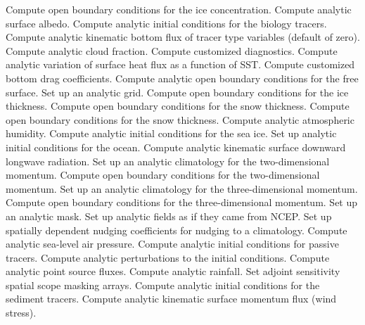    \begin{klist}
      Compute open boundary conditions for the ice
   concentration.
      Compute analytic surface albedo.
      Compute analytic initial conditions for the
   biology tracers.
       Compute analytic kinematic bottom flux of
   tracer type variables (default of zero).
      Compute analytic cloud fraction.
      Compute customized diagnostics.
      Compute analytic variation of surface heat
   flux as a function of SST.
      Compute customized bottom drag coefficients.
      Compute analytic open boundary conditions for
   the free surface.
       Set up an analytic grid.
      Compute open boundary conditions for the ice
   thickness.
      Compute open boundary conditions for the snow
   thickness.
      Compute open boundary conditions for the snow
   thickness.
      Compute analytic atmospheric humidity.
      Compute analytic initial conditions for the sea ice.
       Set up analytic initial conditions for the ocean.
       Compute analytic kinematic surface
   downward longwave radiation.
      Set up an analytic climatology for the
   two-dimensional momentum.
      Compute open boundary conditions for the
   two-dimensional momentum.
      Set up an analytic climatology for the
   three-dimensional momentum.
      Compute open boundary conditions for the
   three-dimensional momentum.
       Set up an analytic mask.
       Set up analytic fields as if they came from NCEP.
       Set up spatially dependent nudging
   coefficients for nudging to a climatology.
       Compute analytic sea-level air pressure.
       Compute analytic initial conditions for
   passive tracers.
       Compute analytic perturbations to the
   initial conditions.
       Compute analytic point source fluxes.
       Compute analytic rainfall.
       Set adjoint sensitivity spatial scope masking
   arrays.
       Compute analytic initial conditions for the
   sediment tracers.
       Compute analytic kinematic surface
   momentum flux (wind stress).

\end{klist}
